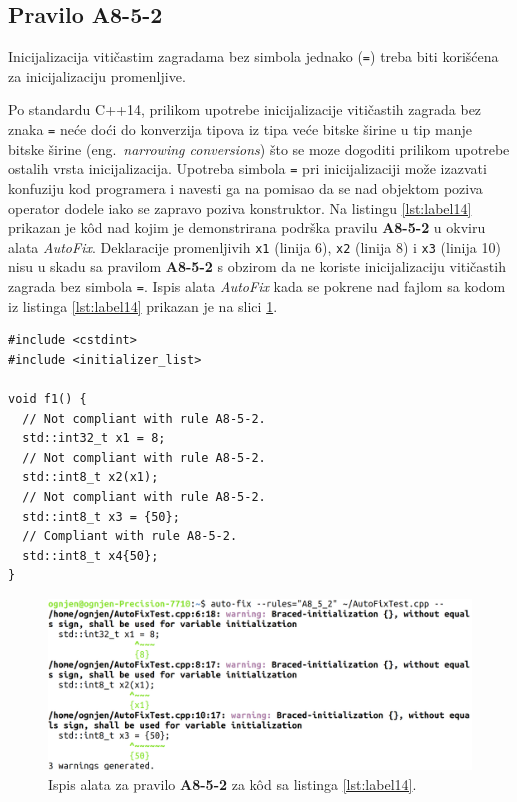 \documentclass[12pt,oneside]{memoir}
\begin{document}
\subsection{Pravilo A8-5-2}
\begin{center}
\begin{tcolorbox}
Inicijalizacija viti\v{c}astim zagradama bez simbola jednako (\texttt{=}) treba biti kori\v{s}\'{c}ena za inicijalizaciju promenljive.
\end{tcolorbox}
\end{center}

Po standardu C++14, prilikom upotrebe inicijalizacije viti\v{c}astih zagrada bez znaka \texttt{=} ne\'{c}e do\'{c}i do konverzija tipova iz tipa ve\'{c}e bitske \v{s}irine u tip manje bitske \v{s}irine (eng.~\textit{narrowing conversions}) \v{s}to se moze dogoditi prilikom upotrebe ostalih vrsta inicijalizacija.
Upotreba simbola \texttt{=} pri inicijalizaciji mo\v{z}e izazvati konfuziju kod programera i navesti ga na pomisao da se nad objektom poziva operator dodele iako se zapravo poziva konstruktor.
Na listingu \ref{lst:label14} prikazan je k\^{o}d nad kojim je demonstrirana podr\v{s}ka pravilu \textbf{A8-5-2} u okviru alata \textit{AutoFix}.
Deklaracije promenljivih \texttt{x1} (linija 6), \texttt{x2} (linija 8) i \texttt{x3} (linija 10) nisu u skadu sa pravilom \textbf{A8-5-2} s obzirom da ne koriste inicijalizaciju viti\v{c}astih zagrada bez simbola \texttt{=}.
Ispis alata \textit{AutoFix} kada se pokrene nad fajlom sa kodom iz listinga \ref{lst:label14} prikazan je na slici \ref{fig:A8-5-2}. \\

\begin{lstlisting}[style=customc, caption={K\^{o}d nad kojim je demonstrirana podr\v{s}ka pravilu \textbf{A8-5-2} u okviru alata \textit{AutoFix}.}, label=lst:label14]
#include <cstdint>
#include <initializer_list>

void f1() {
  // Not compliant with rule A8-5-2.
  std::int32_t x1 = 8;
  // Not compliant with rule A8-5-2.
  std::int8_t x2(x1);
  // Not compliant with rule A8-5-2.
  std::int8_t x3 = {50};
  // Compliant with rule A8-5-2.
  std::int8_t x4{50};
}
\end{lstlisting}

\begin{figure}[!h]
\begin{center}
\includegraphics[scale=0.22]{A8_5_2.png}
\end{center}
\caption{Ispis alata za pravilo \textbf{A8-5-2} za k\^{o}d sa listinga \ref{lst:label14}.}
\label{fig:A8-5-2}
\end{figure}
\end{document}
